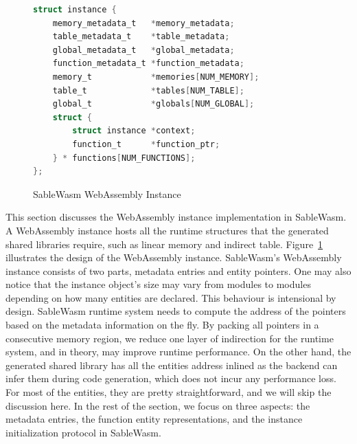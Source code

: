 \begin{figure}
\begin{minipage}{.35\textwidth}
    \end{minipage}\hfill
    \begin{minipage}{.6\textwidth}
        \begin{lstlisting}[language=C, basicstyle=\ttfamily\footnotesize]
struct instance {
    memory_metadata_t   *memory_metadata;
    table_metadata_t    *table_metadata;
    global_metadata_t   *global_metadata;
    function_metadata_t *function_metadata;
    memory_t            *memories[NUM_MEMORY];
    table_t             *tables[NUM_TABLE];
    global_t            *globals[NUM_GLOBAL];
    struct {
        struct instance *context;
        function_t      *function_ptr;
    } * functions[NUM_FUNCTIONS];
};        
    \end{lstlisting}
    \end{minipage}
    \caption{SableWasm WebAssembly Instance}
    \label{fig:backend-instance}
\end{figure}

This section discusses the WebAssembly instance implementation in SableWasm. A WebAssembly instance hosts all the runtime structures that the generated shared libraries require, such as linear memory and indirect table. Figure~\ref{fig:backend-instance} illustrates the design of the WebAssembly instance. SableWasm's WebAssembly instance consists of two parts, metadata entries and entity pointers. One may also notice that the instance object's size may vary from modules to modules depending on how many entities are declared. This behaviour is intensional by design. SableWasm runtime system needs to compute the address of the pointers based on the metadata information on the fly. By packing all pointers in a consecutive memory region, we reduce one layer of indirection for the runtime system, and in theory, may improve runtime performance. On the other hand, the generated shared library has all the entities address inlined as the backend can infer them during code generation, which does not incur any performance loss. For most of the entities, they are pretty straightforward, and we will skip the discussion here. In the rest of the section, we focus on three aspects: the metadata entries, the function entity representations, and the instance initialization protocol in SableWasm.

